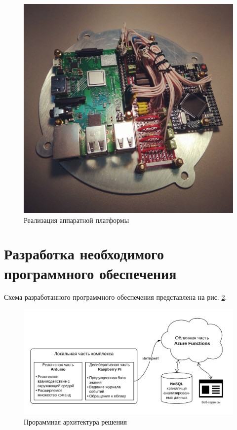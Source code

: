 \begin{figure}[H]
    \centering
    \includegraphics[scale=0.4]{images/apparat_platform.jpg}
    \caption{Реализация аппаратной платформы}
    \label{apparat_plfm_img}
\end{figure}

\section{Разработка необходимого программного обеспечения}

Схема разработанного программного обеспечения представлена на рис. \ref{PO_scheme_img}.

\begin{figure}[H]
    \centering
    \includegraphics[scale=0.2]{images/po.png}
    \caption{Прораммная архитектура решения}
    \label{PO_scheme_img}
\end{figure}

